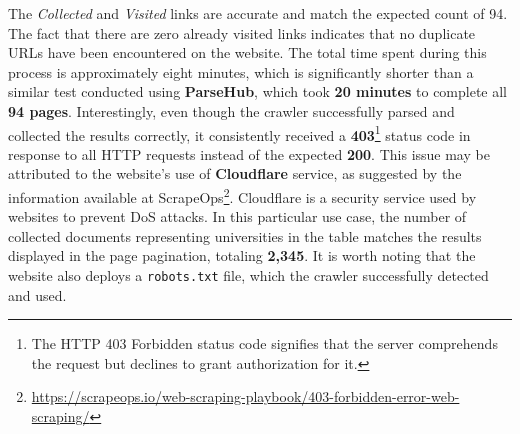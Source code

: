 {The \textit{Collected} and \textit{Visited} links are accurate and match the expected count of 94. The fact that there are zero already visited links indicates that no duplicate URLs have been encountered on the website. The total time spent during this process is approximately eight minutes, which is significantly shorter than a similar test conducted using \textbf{ParseHub}, which took \textbf{20 minutes} to complete all \textbf{94 pages}.
Interestingly, even though the crawler successfully parsed and collected the results correctly, it consistently received a \textbf{403}\footnote{The HTTP 403 Forbidden status code signifies that the server comprehends the request but declines to grant authorization for it.} status code in response to all HTTP requests instead of the expected \textbf{200}. This issue may be attributed to the website's use of \textbf{Cloudflare} service, as suggested by the information available at ScrapeOps\footnote{\url{https://scrapeops.io/web-scraping-playbook/403-forbidden-error-web-scraping/}}. Cloudflare is a security service used by websites to prevent DoS attacks.
In this particular use case, the number of collected documents representing universities in the table matches the results displayed in the page pagination, totaling \textbf{2,345}. It is worth noting that the website also deploys a \texttt{robots.txt} file, which the crawler successfully detected and used.


}
